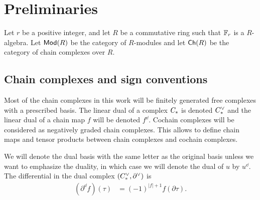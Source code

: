 
\section{Preliminaries}\label{s:preliminaries}

Let $r$ be a positive integer, and let $R$ be a commutative ring such that $\mathbb{F}_r$ is a $R$-algebra.
Let $\mathsf{Mod}(R)$ be the category of $R$-modules and let $\mathsf{Ch}(R)$ be the category of chain complexes over $R$.

\subsection{Chain complexes and sign conventions}

Most of the chain complexes in this work will be finitely generated free complexes with a prescribed basis. The linear dual of a complex $C_{*}$ is denoted $C^\vee_{*}$ and the linear dual of a chain map $f$ will be denoted $f^\dd$. Cochain complexes will be considered as negatively graded chain complexes. This allows to define chain maps and tensor products between chain complexes and cochain complexes.

We will denote the dual basis with the same letter as the original basis unless we want to emphasize the duality, in which case we will denote the dual of $u$ by $u^\dd$. The differential in the dual complex $(C^\vee_{*},\partial^\vee)$ is
\begin{align*}
	(\partial^\dd f)(\tau) &= (-1)^{|f|+1} f(\partial \tau). %
\end{align*}

